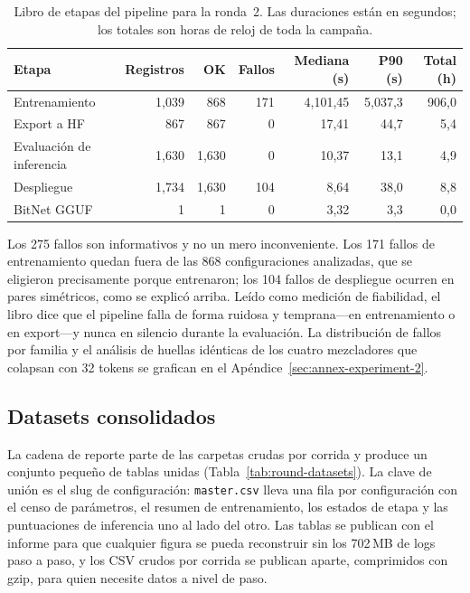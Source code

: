 \begin{table}[H]
\centering
\small
\caption{Libro de etapas del pipeline para la ronda~2. Las duraciones están en segundos; los totales son horas de reloj de toda la campaña.}
\label{tab:stage-ledger}
\begin{tabular}{lrrrrrr}
\toprule
Etapa & Registros & OK & Fallos & Mediana (s) & P90 (s) & Total (h) \\
\midrule
Entrenamiento          & 1{,}039 & 868  & 171 & 4{,}101,45 & 5{,}037,3 & 906,0 \\
Export a HF            & 867     & 867  & 0   & 17,41      & 44,7      & 5,4   \\
Evaluación de inferencia & 1{,}630 & 1{,}630 & 0 & 10,37     & 13,1      & 4,9   \\
Despliegue             & 1{,}734 & 1{,}630 & 104 & 8,64     & 38,0      & 8,8   \\
BitNet GGUF            & 1       & 1    & 0   & 3,32       & 3,3       & 0,0   \\
\bottomrule
\end{tabular}
\end{table}

Los 275 fallos son informativos y no un mero inconveniente. Los 171 fallos de entrenamiento quedan fuera de las 868 configuraciones analizadas, que se eligieron precisamente porque entrenaron; los 104 fallos de despliegue ocurren en pares simétricos, como se explicó arriba. Leído como medición de fiabilidad, el libro dice que el pipeline falla de forma ruidosa y temprana---en entrenamiento o en export---y nunca en silencio durante la evaluación. La distribución de fallos por familia y el análisis de huellas idénticas de los cuatro mezcladores que colapsan con 32 tokens se grafican en el Apéndice~\ref{sec:annex-experiment-2}.

\subsection{Datasets consolidados}

La cadena de reporte parte de las carpetas crudas por corrida y produce un conjunto pequeño de tablas unidas (Tabla~\ref{tab:round-datasets}). La clave de unión es el slug de configuración: \texttt{master.csv} lleva una fila por configuración con el censo de parámetros, el resumen de entrenamiento, los estados de etapa y las puntuaciones de inferencia uno al lado del otro. Las tablas se publican con el informe para que cualquier figura se pueda reconstruir sin los 702\,MB de logs paso a paso, y los CSV crudos por corrida se publican aparte, comprimidos con gzip, para quien necesite datos a nivel de paso.

